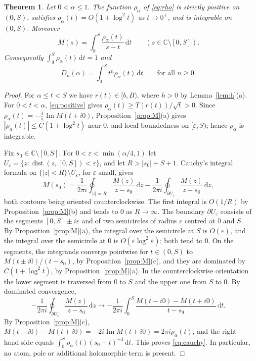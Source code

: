 \documentclass[11pt]{amsart}
\numberwithin{equation}{section}
\newtheorem{theorem}{Theorem}[section]
\theoremstyle{definition}
\theoremstyle{remark}
\newcommand{\C}{\mathbb{C}}
\newcommand{\dd}{\,\mathrm{d}}
\DeclareMathOperator{\im}{Im}
\begin{document}
\begin{theorem}\label{thm:alpha}
Let $0<\alpha\le1$. The function $\rho_\alpha$ of \eqref{eq:rho} is strictly
positive on $(0,S)$, satisfies $\rho_\alpha(t)=O(1+\log^2t)$ as $t\to0^+$, and
is integrable on $(0,S)$. Moreover
\begin{equation}\label{eq:cauchy}
M(s)=\int_0^S\frac{\rho_\alpha(t)}{s-t}\dd t\qquad(s\in\C\setminus[0,S]).
\end{equation}
Consequently $\int_0^S\rho_\alpha(t)\dd t=1$ and
\begin{equation}\label{eq:momentsD}
D_n(\alpha)=\int_0^St^n\rho_\alpha(t)\dd t\qquad\text{for all } n\ge0 .
\end{equation}
\end{theorem}

\begin{proof}
For $\alpha\le t<S$ we have $r(t)\in[b,B)$, where $h>0$ by
Lemma~\ref{lem:h}(a). For $0<t<\alpha$, \eqref{eq:positive} gives
$\rho_\alpha(t)\ge T(r(t))/\sqrt t>0$. Since
$\rho_\alpha(t)=-\frac1\pi\im M(t+i0)$, Proposition~\ref{prop:M}(a) gives
$|\rho_\alpha(t)|\le C(1+\log^2t)$ near $0$, and local boundedness on
$[\varepsilon,S)$; hence $\rho_\alpha$ is integrable.

Fix $s_0\in\C\setminus[0,S]$. For $0<\varepsilon<\min(\alpha/4,1)$ let
$U_\varepsilon=\{z:\operatorname{dist}(z,[0,S])<\varepsilon\}$, and let
$R>|s_0|+S+1$. Cauchy's integral formula on
$\{|z|<R\}\setminus\overline{U_\varepsilon}$, for $\varepsilon$ small, gives
\[
M(s_0)=\frac1{2\pi i}\oint_{|z|=R}\frac{M(z)}{z-s_0}\dd z
-\frac1{2\pi i}\oint_{\partial U_\varepsilon}\frac{M(z)}{z-s_0}\dd z ,
\]
both contours being oriented counterclockwise. The first integral is
$O(1/R)$ by Proposition~\ref{prop:M}(b) and tends to $0$ as $R\to\infty$. The
boundary $\partial U_\varepsilon$ consists of the segments $[0,S]\pm
i\varepsilon$ and of two semicircles of radius $\varepsilon$ centred at $0$
and $S$. By Proposition~\ref{prop:M}(a), the integral over the semicircle at
$S$ is $O(\varepsilon)$, and the integral over the semicircle at $0$ is
$O(\varepsilon\log^2\varepsilon)$; both tend to $0$. On the segments, the
integrands converge pointwise for $t\in(0,S)$ to $M(t\pm i0)/(t-s_0)$, by
Proposition~\ref{prop:M}(c), and they are dominated by $C(1+\log^2t)$, by
Proposition~\ref{prop:M}(a). In the counterclockwise orientation the lower
segment is traversed from $0$ to $S$ and the upper one from $S$ to $0$. By
dominated convergence,
\[
-\frac1{2\pi i}\oint_{\partial U_\varepsilon}\frac{M(z)}{z-s_0}\dd z
\longrightarrow-\frac1{2\pi i}\int_0^S\frac{M(t-i0)-M(t+i0)}{t-s_0}\dd t .
\]
By Proposition~\ref{prop:M}(c),
$M(t-i0)-M(t+i0)=-2i\im M(t+i0)=2\pi i\rho_\alpha(t)$, and the right-hand
side equals $\int_0^S\rho_\alpha(t)(s_0-t)^{-1}\dd t$. This proves
\eqref{eq:cauchy}. In particular, no atom, pole or additional holomorphic
term is present.


\end{proof}
\end{document}
